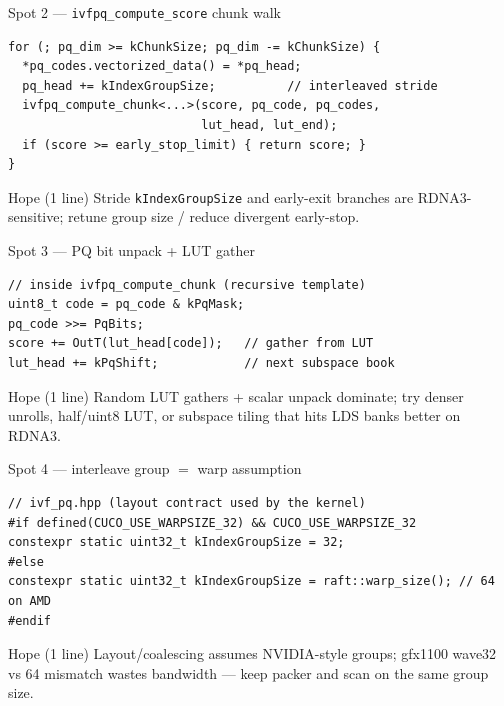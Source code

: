 \documentclass[aspectratio=169,10pt]{beamer}
\begin{document}
\begin{frame}[fragile]{Spot 2 --- \texttt{ivfpq\_compute\_score} chunk walk}
\begin{lstlisting}
for (; pq_dim >= kChunkSize; pq_dim -= kChunkSize) {
  *pq_codes.vectorized_data() = *pq_head;
  pq_head += kIndexGroupSize;          // interleaved stride
  ivfpq_compute_chunk<...>(score, pq_code, pq_codes,
                           lut_head, lut_end);
  if (score >= early_stop_limit) { return score; }
}
\end{lstlisting}
  \vspace{0.3em}
  \begin{alertblock}{Hope (1 line)}
    Stride \texttt{kIndexGroupSize} and early-exit branches are RDNA3-sensitive;
    retune group size / reduce divergent early-stop.
  \end{alertblock}
\end{frame}

\begin{frame}[fragile]{Spot 3 --- PQ bit unpack + LUT gather}
\begin{lstlisting}
// inside ivfpq_compute_chunk (recursive template)
uint8_t code = pq_code & kPqMask;
pq_code >>= PqBits;
score += OutT(lut_head[code]);   // gather from LUT
lut_head += kPqShift;            // next subspace book
\end{lstlisting}
  \vspace{0.3em}
  \begin{alertblock}{Hope (1 line)}
    Random LUT gathers + scalar unpack dominate; try denser unrolls,
    half/uint8 LUT, or subspace tiling that hits LDS banks better on RDNA3.
  \end{alertblock}
\end{frame}

\begin{frame}[fragile]{Spot 4 --- interleave group $=$ warp assumption}
\begin{lstlisting}
// ivf_pq.hpp (layout contract used by the kernel)
#if defined(CUCO_USE_WARPSIZE_32) && CUCO_USE_WARPSIZE_32
constexpr static uint32_t kIndexGroupSize = 32;
#else
constexpr static uint32_t kIndexGroupSize = raft::warp_size(); // 64 on AMD
#endif
\end{lstlisting}
  \vspace{0.3em}
  \begin{alertblock}{Hope (1 line)}
    Layout/coalescing assumes NVIDIA-style groups; gfx1100 wave32 vs 64
    mismatch wastes bandwidth --- keep packer and scan on the same group size.
  \end{alertblock}
\end{frame}
\end{document}
